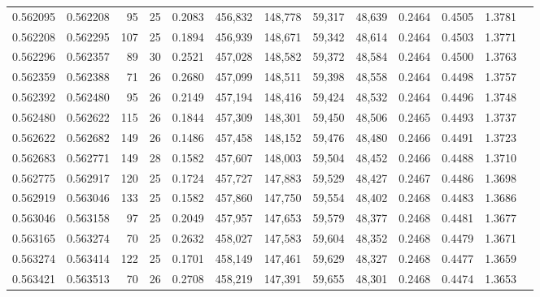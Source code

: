 \begin{tabular}{rrrrrrrrrrrrr}
0.562095 & 0.562208 &  95 &  25 &                                     0.2083 & 456,832 & 148,778 &  59,317 &  48,639 & 0.2464 & 0.4505 & 1.3781 \\
0.562208 & 0.562295 & 107 &  25 &                                     0.1894 & 456,939 & 148,671 &  59,342 &  48,614 & 0.2464 & 0.4503 & 1.3771 \\
0.562296 & 0.562357 &  89 &  30 &                                     0.2521 & 457,028 & 148,582 &  59,372 &  48,584 & 0.2464 & 0.4500 & 1.3763 \\
0.562359 & 0.562388 &  71 &  26 &                                     0.2680 & 457,099 & 148,511 &  59,398 &  48,558 & 0.2464 & 0.4498 & 1.3757 \\
0.562392 & 0.562480 &  95 &  26 &                                     0.2149 & 457,194 & 148,416 &  59,424 &  48,532 & 0.2464 & 0.4496 & 1.3748 \\
0.562480 & 0.562622 & 115 &  26 &                                     0.1844 & 457,309 & 148,301 &  59,450 &  48,506 & 0.2465 & 0.4493 & 1.3737 \\
0.562622 & 0.562682 & 149 &  26 &                                     0.1486 & 457,458 & 148,152 &  59,476 &  48,480 & 0.2466 & 0.4491 & 1.3723 \\
0.562683 & 0.562771 & 149 &  28 &                                     0.1582 & 457,607 & 148,003 &  59,504 &  48,452 & 0.2466 & 0.4488 & 1.3710 \\
0.562775 & 0.562917 & 120 &  25 &                                     0.1724 & 457,727 & 147,883 &  59,529 &  48,427 & 0.2467 & 0.4486 & 1.3698 \\
0.562919 & 0.563046 & 133 &  25 &                                     0.1582 & 457,860 & 147,750 &  59,554 &  48,402 & 0.2468 & 0.4483 & 1.3686 \\
0.563046 & 0.563158 &  97 &  25 &                                     0.2049 & 457,957 & 147,653 &  59,579 &  48,377 & 0.2468 & 0.4481 & 1.3677 \\
0.563165 & 0.563274 &  70 &  25 &                                     0.2632 & 458,027 & 147,583 &  59,604 &  48,352 & 0.2468 & 0.4479 & 1.3671 \\
0.563274 & 0.563414 & 122 &  25 &                                     0.1701 & 458,149 & 147,461 &  59,629 &  48,327 & 0.2468 & 0.4477 & 1.3659 \\
0.563421 & 0.563513 &  70 &  26 &                                     0.2708 & 458,219 & 147,391 &  59,655 &  48,301 & 0.2468 & 0.4474 & 1.3653 \\

\end{tabular}
